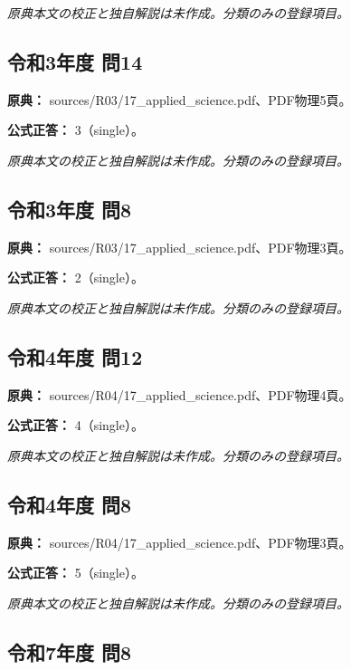 \par\textit{原典本文の校正と独自解説は未作成。分類のみの登録項目。}

\subsection{令和3年度 問14}
\label{q:r03-reg-applied-14}

\noindent\textbf{原典：} sources/R03/17\_applied\_science.pdf、PDF物理5頁。

\textbf{公式正答：} 3（single）。

\par\textit{原典本文の校正と独自解説は未作成。分類のみの登録項目。}

\subsection{令和3年度 問8}
\label{q:r03-reg-applied-08}

\noindent\textbf{原典：} sources/R03/17\_applied\_science.pdf、PDF物理3頁。

\textbf{公式正答：} 2（single）。

\par\textit{原典本文の校正と独自解説は未作成。分類のみの登録項目。}

\subsection{令和4年度 問12}
\label{q:r04-reg-applied-12}

\noindent\textbf{原典：} sources/R04/17\_applied\_science.pdf、PDF物理4頁。

\textbf{公式正答：} 4（single）。

\par\textit{原典本文の校正と独自解説は未作成。分類のみの登録項目。}

\subsection{令和4年度 問8}
\label{q:r04-reg-applied-08}

\noindent\textbf{原典：} sources/R04/17\_applied\_science.pdf、PDF物理3頁。

\textbf{公式正答：} 5（single）。

\par\textit{原典本文の校正と独自解説は未作成。分類のみの登録項目。}

\subsection{令和7年度 問8}
\label{q:r07-reg-applied-08}


